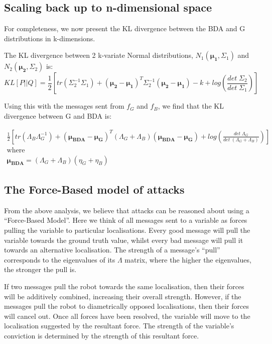 \subsection{Scaling back up to n-dimensional space}
For completeness, we now present the KL divergence between the BDA and G distributions in k-dimensions.

The KL divergence between 2 k-variate Normal distributions, $N_1(\boldsymbol{\mu_1}, \Sigma_1)$ and $N_2(\boldsymbol{\mu_2}, \Sigma_2)$ is:
\begin{equation}
	KL\left[P || Q \right] = \frac{1}{2}\left[
		tr(\Sigma_2^{-1}\Sigma_1) + \left(\boldsymbol{\mu_2} - \boldsymbol{\mu_1}\right)^T \Sigma_2^{-1} \left(\boldsymbol{\mu_2} - \boldsymbol{\mu_1}\right) - k + log\left(\frac{det \; \Sigma_2}{det \; \Sigma_1}\right)
	\right]
\end{equation}

Using this with the messages sent from $f_G$ and $f_B$, we find that the KL divergence between G and BDA is:

\begin{gather}
	\frac{1}{2} \left[
		tr\left(\Lambda_B\Lambda_G^{-1}\right) +
		\left(\boldsymbol{\mu_{BDA}} - \boldsymbol{\mu_G}\right)^T \left(\Lambda_G + \Lambda_B\right) \left(\boldsymbol{\mu_{BDA}} - \boldsymbol{\mu_G}\right) + log\left(\frac{det \; \Lambda_G}{det \; \left(\Lambda_G + \Lambda_B\right)}\right)
	\right]\\
	\text{where}\nonumber\\
	\boldsymbol{\mu_{BDA}} = \left(\Lambda_G + \Lambda_B\right) \left(\eta_G + \eta_B\right)\nonumber
\end{gather}

\subsection{The Force-Based model of attacks}
From the above analysis, we believe that attacks can be reasoned about using a ``Force-Based Model''. Here we think of all messages sent to a variable as forces pulling the variable to particular localisations. Every good message will pull the variable towards the ground truth value, whilst every bad message will pull it towards an alternative localisation. The strength of a message's ``pull'' corresponds to the eigenvalues of its $\Lambda$ matrix, where the higher the eigenvalues, the stronger the pull is.

If two messages pull the robot towards the same localisation, then their forces will be additively combined, increasing their overall strength. However, if the messages pull the robot to diametrically opposed localisations, then their forces will cancel out. Once all forces have been resolved, the variable will move to the localisation suggested by the resultant force. The strength of the variable's conviction is determined by the strength of this resultant force.

